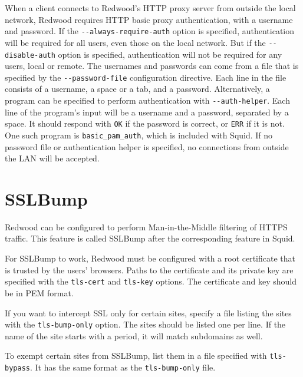 \documentclass{article}
\begin{document}
When a client connects to Redwood's HTTP proxy server from outside the local network,
Redwood requires HTTP basic proxy authentication, with a username and password.
If the \verb"--always-require-auth" option is specified, 
authentication will be required for all users, even those on the local network.
But if the \verb"--disable-auth" option is specified, 
authentication will not be required for any users, local or remote.
The usernames and passwords can come from a file that is specified by the \verb"--password-file"
configuration directive. Each line in the file consists of a username,
a space or a tab, and a password.
Alternatively, a program can be specified to perform authentication with \verb"--auth-helper".
Each line of the program's input will be a username and a password, separated by a space.
It should respond with \verb"OK" if the password is correct, or \verb"ERR" if it is not.
One such program is \verb"basic_pam_auth", which is included with Squid.
If no password file or authentication helper is specified, no connections from outside the LAN will be accepted.

\section{SSLBump}

Redwood can be configured to perform Man-in-the-Middle filtering of HTTPS traffic.
This feature is called SSLBump after the corresponding feature in Squid.

For SSLBump to work, Redwood must be configured with a root certificate that is trusted
by the users' browsers.
Paths to the certificate and its private key are specified with the \verb"tls-cert" and \verb"tls-key"
options.
The certificate and key should be in PEM format.

If you want to intercept SSL only for certain sites, 
specify a file listing the sites with the \verb"tls-bump-only" option.
The sites should be listed one per line.
If the name of the site starts with a period, it will match subdomains as well.

To exempt certain sites from SSLBump,
list them in a file specified with \verb"tls-bypass".
It has the same format as the \verb"tls-bump-only" file.
\end{document}
